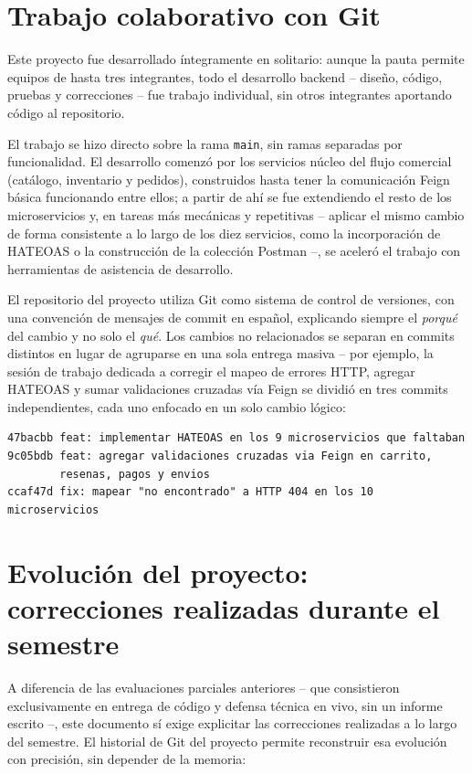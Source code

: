 \section{Trabajo colaborativo con Git}

Este proyecto fue desarrollado íntegramente en solitario: aunque la pauta permite
equipos de hasta tres integrantes, todo el desarrollo backend -- diseño, código,
pruebas y correcciones -- fue trabajo individual, sin otros integrantes aportando
código al repositorio.

El trabajo se hizo directo sobre la rama \texttt{main}, sin ramas separadas por
funcionalidad. El desarrollo comenzó por los servicios núcleo del flujo comercial
(catálogo, inventario y pedidos), construidos hasta tener la comunicación Feign básica
funcionando entre ellos; a partir de ahí se fue extendiendo el resto de los
microservicios y, en tareas más mecánicas y repetitivas -- aplicar el mismo cambio de
forma consistente a lo largo de los diez servicios, como la incorporación de HATEOAS o
la construcción de la colección Postman --, se aceleró el trabajo con herramientas de
asistencia de desarrollo.

El repositorio del proyecto utiliza Git como sistema de control de versiones, con una
convención de mensajes de commit en español, explicando siempre el \textit{porqué} del
cambio y no solo el \textit{qué}. Los cambios no relacionados se separan en commits
distintos en lugar de agruparse en una sola entrega masiva -- por ejemplo, la sesión de
trabajo dedicada a corregir el mapeo de errores HTTP, agregar HATEOAS y sumar
validaciones cruzadas vía Feign se dividió en tres commits independientes, cada uno
enfocado en un solo cambio lógico:

\begin{lstlisting}[caption={Extracto de \texttt{git log --oneline}}]
47bacbb feat: implementar HATEOAS en los 9 microservicios que faltaban
9c05bdb feat: agregar validaciones cruzadas via Feign en carrito,
        resenas, pagos y envios
ccaf47d fix: mapear "no encontrado" a HTTP 404 en los 10 microservicios
\end{lstlisting}

\section{Evolución del proyecto: correcciones realizadas durante el semestre}
\label{sec:evolucion}

A diferencia de las evaluaciones parciales anteriores -- que consistieron
exclusivamente en entrega de código y defensa técnica en vivo, sin un informe escrito
--, este documento sí exige explicitar las correcciones realizadas a lo largo del
semestre. El historial de Git del proyecto permite reconstruir esa evolución con
precisión, sin depender de la memoria:

